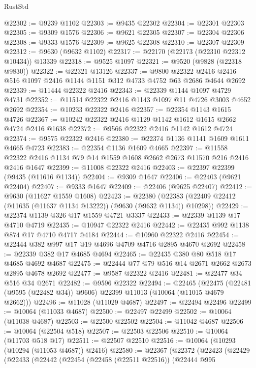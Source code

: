\begin{lexlean}{RustStd}
\begin{coremodule}
@22302 := @9239 @1102
@22303 := @9435 @22302
@22304 := @22301 @22303
@22305 := @9309 @1576
@22306 := @9621 @22305
@22307 := @22304 @22306
@22308 := @9333 @1576
@22309 := @9625 @22308
@22310 := @22307 @22309
@22312 := @9630 (@9632 @1102)
@22317 := @22170 (@22173 (@22310 @22312 @10434)) @13339
@22318 := @9525 @1097
@22321 := @9520 (@9828 (@22318 @9830))
@22322 := @22321 @13126
@22337 := @9800
    @22322
    @2416
    @2416
    @516
    @1097
    @2416
    @1144
    @1151
    @312
    @4733
    @4752
    @63
    @2686
    @4644
    @2692
@22339 := @11444 @22322 @2416
@22343 := @22339 @1144 @1097 @4729 @4731
@22352 := @11514 @22322 @2416 @1143 @1097 @11 @4726 @3003 @4652 @2692
@22354 := @10233 @22322 @2416
@22357 := @22354 @1143 @1615 @4726
@22367 := @10242 @22322 @2416 @1129 @1142 @1612 @1615 @2662 @4724 @2416 @1638
@22372 := @9566 @22322 @2416 @1142 @1612 @4724
@22374 := @9575 @22322 @2416
@22380 := @22374 @1136 @1141 @1609 @1611 @4665 @4723
@22383 := @22354 @1136 @1609 @4665
@22397 := @11558 @22322 @2416 @1134 @79 @14 @1559 @1608 @2662 @2673 @11570 @216 @2416 @2416 @1647
@22399 := @11008 @22322 @2416
@22403 := @22397 @22399 (@9435 (@11616 @1134))
@22404 := @9309 @1647
@22406 := @22403 (@9621 @22404)
@22407 := @9333 @1647
@22409 := @22406 (@9625 @22407)
@22412 := @9630 (@11627 @1559 @1608)
@22423 := @22380
    (@22383 (@22409 @22412 (@11635 (@11637 @1134 @13222)) (@9630 (@9632 @1134)) @10298))
@22429 := @22374 @1139 @326 @17 @1559 @4721 @3337
@22433 := @22339 @1139 @17 @4710 @4719
@22435 := @10947 @22322 @2416
@22442 := @22435 @992 @1138 @874 @17 @4710 @4717 @4184
@22444 := @10960 @22322 @2416
@22454 := @22444 @382 @997 @17 @19 @4696 @4709 @4716 @2895 @4670 @2692
@22458 := @22339 @382 @17 @4685 @4694
@22465 := @22435 @380 @80 @518 @17 @4685 @4692 @4687
@22475 := @22444 @77 @79 @516 @14 @2671 @2662 @2673 @2895 @4678 @2692
@22477 := @9587 @22322 @2416
@22481 := @22477 @34 @516 @34 @2671
@22482 := @9596 @22322
@22494 := @22465
    (@22475 (@22481 (@9595 (@22482 @34)) @9606) @22399 @11013 (@10064 (@11015 @4679 @2662)))
@22496 := @11028 (@11029 @4687)
@22497 := @22494 @22496
@22499 := @10064 (@11033 @4687)
@22500 := @22497 @22499
@22502 := @10064 (@11038 @4687)
@22503 := @22500 @22502
@22504 := @11042 @4687
@22506 := @10064 (@22504 @518)
@22507 := @22503 @22506
@22510 := @10064 (@11703 @518 @17)
@22511 := @22507 @22510
@22516 := @10064 (@10293 (@10294 (@11053 @4687)) @2416)
@22580 := @22367
    (@22372
      (@22423
        (@22429
          (@22433
            (@22442
              (@22454
                (@22458 (@22511 @22516))
                (@22444
                  @995

\end{coremodule}
\end{lexlean}
